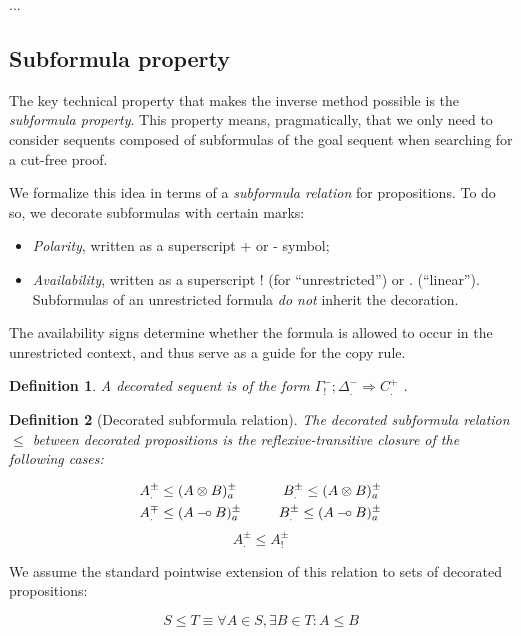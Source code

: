\documentclass{article}
\newtheorem{definition}{Definition}
\def\limp {\mathbin{{-}\mkern-3.5mu{\circ}}}
\begin{document}
...

\subsection{Subformula property}

The key technical property that makes the inverse method possible is the
\emph{subformula property}. This property means, pragmatically, that we only
need to consider sequents composed of subformulas of the goal sequent when
searching for a cut-free proof.

We formalize this idea in terms of a \emph{subformula relation} for
propositions. To do so, we decorate subformulas with certain marks:

\begin{itemize}
\item \emph{Polarity}, written as a superscript + or - symbol;
\item \emph{Availability}, written as a superscript ! (for ``unrestricted'') or
  . (``linear''). Subformulas of an unrestricted formula \emph{do not} inherit
  the decoration.
\end{itemize}

The availability signs determine whether the formula is allowed to occur in the
unrestricted context, and thus serve as a guide for the copy rule.

\begin{definition}
  A decorated sequent is of the form $\Gamma^-_! ; \Delta^-_. \Longrightarrow
  C^+_.$ .
\end{definition}

\begin{definition}[Decorated subformula relation]
  The decorated subformula relation $\leq$ between decorated propositions is the
  reflexive-transitive closure of the following cases:

  \begin{alignat*}{2}
    & A^{\pm}_{.} \leq (A \otimes B)_a^{\pm} \qquad & B^{\pm}_{.} \leq (A \otimes
    B)_a^{\pm} \\
    & A^{\mp}_{.} \leq (A \limp B)_a^{\pm} & B^{\pm}_{.} \leq (A \limp
    B)_a^{\pm}
  \end{alignat*}
  \[
    A^{\pm}_{.} \leq A^{\pm}_{!}
  \]
\end{definition}

We assume the standard pointwise extension of this relation to sets of decorated
propositions:

\[
  S \leq T \equiv \forall A \in S, \exists B \in T : A \leq B
\]
\end{document}
